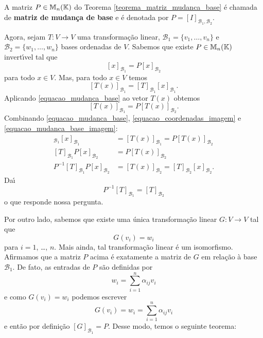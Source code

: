 \begin{definicao}
	A matriz $P \in \mathbb{M}_n(\mathbb{K})$ do Teorema \ref{teorema_matriz_mudanca_base} \'e chamada de \textbf{matriz de mudan\c{c}a de base} e \'e denotada por $P = [I]_{{\mathcal{B}_1},{\mathcal{B}_2}}$.
\end{definicao}

Agora, sejam $T : V \to V$ uma transforma\c{c}\~ao linear, $\mathcal{B}_1 = \{v_1,\dots,v_n\}$ e $\mathcal{B}_2 = \{w_1,\dots,w_n\}$ bases ordenadas de $V$. Sabemos que existe $P \in \mathbb{M}_n(\mathbb{K})$ invert{\'\i}vel tal que
\begin{equation}\label{equacao_mudanca_base}
	[x]_{\mathcal{B}_1} = P[x]_{\mathcal{B}_2}
\end{equation}
para todo $x \in V$. Mas, para todo $x \in V$ temos
\begin{equation}\label{equacao_coordenadas_imagem}
	[T(x)]_{\mathcal{B}_1} = [T]_{\mathcal{B}_1}[x]_{\mathcal{B}_1}.
\end{equation}
Aplicando \eqref{equacao_mudanca_base} ao vetor $T(x)$ obtemos
\begin{equation}\label{equacao_mudanca_base_imagem}
	[T(x)]_{\mathcal{B}_1} = P[T(x)]_{\mathcal{B}_2}.
\end{equation}
Combinando \eqref{equacao_mudanca_base}, \eqref{equacao_coordenadas_imagem} e \eqref{equacao_mudanca_base_imagem}:
\begin{align*}
	[T]_{\mathcal{B}_1}[x]_{\mathcal{B}_1} &= [T(x)]_{\mathcal{B}_1} = P[T(x)]_{\mathcal{B}_2}\\
	[T]_{\mathcal{B}_1}P[x]_{\mathcal{B}_2} &= P[T(x)]_{\mathcal{B}_2}\\
	P^{-1}[T]_{\mathcal{B}_1}P[x]_{\mathcal{B}_2} &= [T(x)]_{\mathcal{B}_2} = [T]_{\mathcal{B}_2}[x]_{\mathcal{B}_2}.
\end{align*}
Da{\'\i}
\[
	P^{-1}[T]_{\mathcal{B}_1} = [T]_{\mathcal{B}_2}
\]
o que responde nossa pergunta.

Por outro lado, sabemos que existe uma \'unica transforma\c{c}\~ao linear $G : V \to V$ tal que
\[
	G(v_i) = w_i
\]
para $i = 1$, \dots, $n$. Mais ainda, tal transforma\c{c}\~ao linear \'e um isomorfismo. Afirmamos que a matriz $P$ acima \'e exatamente a matriz de $G$ em rela\c{c}\~ao \`a base $\mathcal{B}_1$. De fato, as entradas de $P$ s\~ao definidas por
\[
	w_i = \sum_{i=1}^n\alpha_{ij}v_i
\]
e como $G(v_i) = w_i$ podemos escrever
\[
	G(v_i) = w_i = \sum_{i=1}^n\alpha_{ij}v_i
\]
e ent\~ao por defini\c{c}\~ao $[G]_{\mathcal{B}_1} = P$. Desse modo, temos o seguinte teorema:


